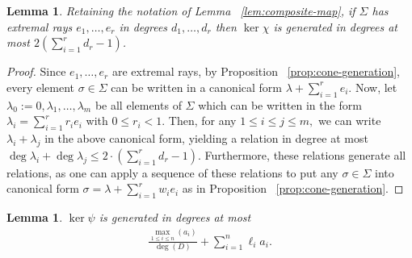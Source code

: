 \documentclass{amsart}
\theoremstyle{plain}
\newtheorem{lem}[thm]{Lemma}
\theoremstyle{definition}
\theoremstyle{remark}
\numberwithin{equation}{section}
\newcommand\bida{a}
\begin{document}
\begin{lem}
\label{lem:bound-ker-chi}
Retaining the notation of Lemma ~\ref{lem:composite-map}, if $\Sigma$ has
extremal rays $e_1,\ldots, e_r$ in degrees $d_1, \ldots, d_r$ then $\ker \chi$
is generated in degrees at most $2(\sum_{i=1}^{r}d_r-1)$.
\end{lem}
\begin{proof}
Since $e_1, \ldots, e_r$ are extremal rays, by Proposition
~\ref{prop:cone-generation}, every element $\sigma \in \Sigma$ can be written
in a canonical form $\lambda + \sum_{i=1}^{r}e_i$. Now, let $\lambda_0 :=
0,\lambda_1, \ldots, \lambda_m$ be all elements of $\Sigma$ which can be
written in the form $\lambda_i = \sum_{i=1}^{r}r_i e_i$ with $0 \leq r_i < 1.$
Then, for any $1 \leq i \leq j \leq m,$ we can write $\lambda_i + \lambda_j$ in
the above canonical form, yielding a relation in degree at most $\deg \lambda_i
+ \deg \lambda_j \leq 2 \cdot \left( \sum_{i=1}^{r}d_r -1 \right).$
Furthermore, these relations generate all relations, as one can apply a
sequence of these relations to put any $\sigma \in \Sigma$ into canonical form
$\sigma = \lambda + \sum_{i=1}^{r}w_i e_i$ as in Proposition
~\ref{prop:cone-generation}.
\end{proof}
\begin{lem}
\label{lem:proj-relations-psi}
$\ker \psi$ is generated in degrees at most
\begin{align}
\label{eqn:proj-relation-degree}
	\frac{\max_{1\le i \le n}(\bida_i)}{\deg(D)} +  \sum_{i=1}^n \ell_i a_i.
\end{align}

\end{lem}
\end{document}
